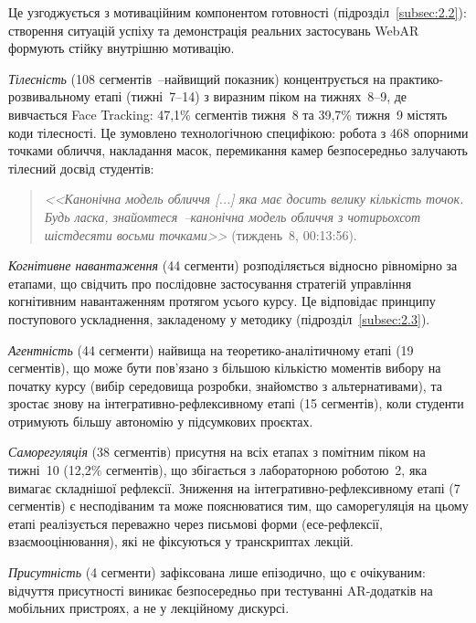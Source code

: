 Це узгоджується з мотиваційним компонентом готовності (підрозділ~\ref{subsec:2.2}): створення ситуацій успіху та демонстрація реальних застосувань WebAR формують стійку внутрішню мотивацію.

\textit{Тілесність} (108 сегментів~--найвищий показник) концентрується на практико-розвивальному етапі (тижні~7--14) з виразним піком на тижнях~8--9, де вивчається Face Tracking: 47,1\% сегментів тижня~8 та 39,7\% тижня~9 містять коди тілесності. Це зумовлено технологічною специфікою: робота з 468 опорними точками обличчя, накладання масок, перемикання камер безпосередньо залучають тілесний досвід студентів:

\begin{quote}
\textit{<<Канонічна модель обличчя \textnormal{[...]} яка має досить велику кількість точок. Будь ласка, знайомтеся~--канонічна модель обличчя з чотирьохсот шістдесяти восьми точками>>} (тиждень~8, 00:13:56).
\end{quote}

\textit{Когнітивне навантаження} (44 сегменти) розподіляється відносно рівномірно за етапами, що свідчить про послідовне застосування стратегій управління когнітивним навантаженням протягом усього курсу. Це відповідає принципу поступового ускладнення, закладеному у методику (підрозділ~\ref{subsec:2.3}).

\textit{Агентність} (44 сегменти) найвища на теоретико-аналітичному етапі (19 сегментів), що може бути пов'язано з більшою кількістю моментів вибору на початку курсу (вибір середовища розробки, знайомство з альтернативами), та зростає знову на інтегративно-рефлексивному етапі (15 сегментів), коли студенти отримують більшу автономію у підсумкових проєктах.

\textit{Саморегуляція} (38 сегментів) присутня на всіх етапах з помітним піком на тижні~10 (12,2\% сегментів), що збігається з лабораторною роботою~2, яка вимагає складнішої рефлексії. Зниження на інтегративно-рефлексивному етапі (7 сегментів) є несподіваним та може пояснюватися тим, що саморегуляція на цьому етапі реалізується переважно через письмові форми (есе-рефлексії, взаємооцінювання), які не фіксуються у транскриптах лекцій.

\textit{Присутність} (4 сегменти) зафіксована лише епізодично, що є очікуваним: відчуття присутності виникає безпосередньо при тестуванні AR-додатків на мобільних пристроях, а не у лекційному дискурсі.


